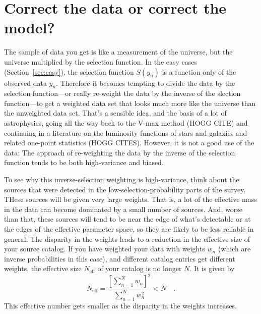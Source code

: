 \documentclass[modern]{aastex62}
\newcommand{\sectionname}{Section}
\begin{document}
\section{Correct the data or correct the model?}\label{sec:correct}

The sample of data you get is like a measurement of the universe, but
the universe multiplied by the selection function.
In the easy cases (\sectionname~\ref{sec:easy}), the selection function
$S(y_n)$ is a function only of the observed data $y_n$.
Therefore it becomes tempting to divide the data by the selection
function---or really re-weight the data by the inverse of the slection
function---to get a weighted data set that looks much more like the
universe than the unweighted data set.
That's a sensible idea, and the basis of a lot of astrophysics, going
all the way back to the V-max method (HOGG CITE) and continuing in a
literature on the luminosity functions of stars and galaxies and
related one-point statistics (HOGG CITES).
However, it is not a good use of the data:
The approach of re-weighting the data by the inverse of the
selection function tends to be both high-variance and biased.

To see why this inverse-selection weighting is high-variance, think about
the sources that were detected in the low-selection-probability parts of
the survey.
THese sources will be given very large weights.
That is, a lot of the effective mass in the data can become dominated by
a small number of sources.
And, worse than that, these sources will tend to be near the edge of
what's detectable or at the edges of the effective parameter space, so
they are likely to be less reliable in general.
The disparity in the weights leads to a reduction in the effective size
of your source catalog.
If you have weighted your data with weights $w_n$ (which are inverse
probabilities in this case), and different catalog entries get
different weights, the effective size $N_\mathrm{eff}$ of your catalog
is no longer $N$.
It is given by
\begin{equation}
N_\mathrm{eff} = \frac{\left[\sum_{n=1}^N w_n\right]^2}{\sum_{n=1}^N w_n^2} < N \quad .
\end{equation}
This effective number gets smaller as the disparity in the weights increases.
\end{document}
